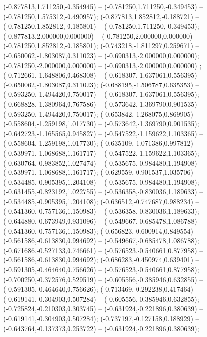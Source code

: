  (-0.877813,1.711250,-0.354945) -- (-0.781250,1.711250,-0.349453) -- (-0.781250,1.575312,-0.490957);
 (-0.877813,1.852812,-0.188721) -- (-0.781250,1.852812,-0.185801) -- (-0.781250,1.711250,-0.349453);
 (-0.877813,2.000000,0.000000) -- (-0.781250,2.000000,0.000000) -- (-0.781250,1.852812,-0.185801);
 (-0.743218,-1.811297,0.259671) -- (-0.650062,-1.803087,0.311023) -- (-0.690313,-2.000000,0.000000);
 (-0.781250,-2.000000,0.000000) -- (-0.690313,-2.000000,0.000000) ;
 (-0.712661,-1.648806,0.468308) -- (-0.618307,-1.637061,0.556395) -- (-0.650062,-1.803087,0.311023);
 (-0.688195,-1.506787,0.635353) -- (-0.593250,-1.494420,0.750017) -- (-0.618307,-1.637061,0.556395);
 (-0.668828,-1.380964,0.767586) -- (-0.573642,-1.369790,0.901535) -- (-0.593250,-1.494420,0.750017);
 (-0.653842,-1.268075,0.869905) -- (-0.558604,-1.259198,1.017730) -- (-0.573642,-1.369790,0.901535);
 (-0.642723,-1.165565,0.945827) -- (-0.547522,-1.159622,1.103365) -- (-0.558604,-1.259198,1.017730);
 (-0.635109,-1.071386,0.997812) -- (-0.539971,-1.068688,1.161717) -- (-0.547522,-1.159622,1.103365);
 (-0.630764,-0.983852,1.027474) -- (-0.535675,-0.984480,1.194908) -- (-0.539971,-1.068688,1.161717);
 (-0.629559,-0.901537,1.035706) -- (-0.534485,-0.905395,1.204108) -- (-0.535675,-0.984480,1.194908);
 (-0.631455,-0.823192,1.022755) -- (-0.536358,-0.830036,1.189633) -- (-0.534485,-0.905395,1.204108);
 (-0.636512,-0.747687,0.988234) -- (-0.541360,-0.757136,1.150983) -- (-0.536358,-0.830036,1.189633);
 (-0.644880,-0.673949,0.931096) -- (-0.549667,-0.685478,1.086788) -- (-0.541360,-0.757136,1.150983);
 (-0.656823,-0.600914,0.849554) -- (-0.561586,-0.613830,0.994692) -- (-0.549667,-0.685478,1.086788);
 (-0.671686,-0.527133,0.746661) -- (-0.576523,-0.540661,0.877958) -- (-0.561586,-0.613830,0.994692);
 (-0.686283,-0.450974,0.639401) -- (-0.591305,-0.464640,0.756626) -- (-0.576523,-0.540661,0.877958);
 (-0.700250,-0.372576,0.529519) -- (-0.605556,-0.385946,0.632855) -- (-0.591305,-0.464640,0.756626);
 (-0.713469,-0.292238,0.417464) -- (-0.619141,-0.304903,0.507284) -- (-0.605556,-0.385946,0.632855);
 (-0.725824,-0.210303,0.303745) -- (-0.631924,-0.221896,0.380639) -- (-0.619141,-0.304903,0.507284);
 (-0.737197,-0.127158,0.188929) -- (-0.643764,-0.137373,0.253722) -- (-0.631924,-0.221896,0.380639);
